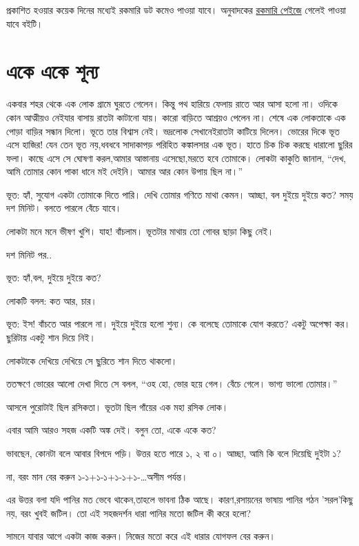 \documentclass[
]{book}
\begin{document}
প্রকাশিত হওয়ার কয়েক দিনের মধ্যেই রকমারি ডট কমেও পাওয়া যাবে। অনুবাদকের \href{https://www.rokomari.com/book/author/47631}{রকমারি পেইজে} গেলেই পাওয়া যাবে বইটি।

\hypertarget{one-one-zero}{%
\chapter{একে একে শূন্য}\label{one-one-zero}}

একবার শহর থেকে এক লোক গ্রামে ঘুরতে গেলেন। কিন্তু পথ হারিয়ে ফেলায় রাতে আর আসা হলো না। ওদিকে কোন আত্মীয়ও নেইযার বাসায় রাতটা কাটানো যায়। কারো বাড়িতে আশ্রয়ও পেলেন না। শেষে এক লোকতাকে এক পোড়া বাড়ির সন্ধান দিলো। ভূতে তার বিশ্বাস নেই। ভদ্রলোক সেখানেইরাতটা কাটিয়ে দিলেন। ভোরের দিকে ভূত এসে হাজির! যেন তেন ভূত নয়,ধবধবে সাদাকাপড় পরিহিত কঙ্কালসার এক ভূত। হাতে চিক চিক করছে ধারালো ছুরির ফলা। কাছে এসে সে ঘোষণা করল,আমার আস্তানায় এসেছো,মরতে হবে তোমাকে। লোকটা কাকুতি জানাল, ``দেখ, আমি তোমার কোন পাকা ধানে মই দেইনি। আমার আর কোন উপায় ছিল না।''

ভূত: হ্যাঁ, সুযোগ একটা তোমাকে দিতে পারি। দেখি তোমার গণিতে মাথা কেমন। আচ্ছা, বল দুইয়ে দুইয়ে কত? সময় দশ মিনিট। বলতে পারলে বেঁচে যাবে।

লোকটা মনে মনে ভীষণ খুশি। যাহ! বাঁচলাম। ভূতটার মাথায় তো গোবর ছাড়া কিছু নেই।

দশ মিনিট পর..

ভূত: হ্যাঁ,বল, দুইয়ে দুইয়ে কত?

লোকটি বলল: কত আর, চার।

ভূত: ইস! বাঁচতে আর পারলে না। দুইয়ে দুইয়ে হলো শুন্য। কে বলেছে তোমাকে যোগ করতে? একটু অপেক্ষা কর। ছুরিটায় একটু শান দিয়ে নিই।

লোকটাকে দেখিয়ে দেখিয়ে সে ছুরিতে শান দিতে থাকলো।

ততক্ষণে ভোরের আলো দেখা দিতে সে বলল, ``ওহ হো, ভোর হয়ে গেল। বেঁচে গেলে। ভাগ্য ভালো তোমার।''

আসলে পুরোটাই ছিল রসিকতা। ভূতটা ছিল গাঁয়ের এক মহা রসিক লোক।

এবার আমি আরও সহজ একটি অঙ্ক দেই। বলুন তো, একে একে কত?

ভাবছেন, কোনটা বলে আবার বিপদে পড়ি। উত্তর হতে পারে ১, ২ বা ০। আচ্ছা, আমি কি বলে দিয়েছি দুইটা ১?

না, বরং মান বের করুন ১-১+১-১+১-১+১-\ldots অসীম পর্যন্ত।

এর উত্তর বলা যদি পানির মত ভেবে থাকেন,তাহলে ভাবনা ঠিক আছে। কারণ,রসায়নের ভাষায় পানির গঠন 'সরল'কিছু নয়, বরং খুবই জটিল। তো এই সহজদর্শন ধারা পানির মতো জটিল কী করে হলো?

সামনে যাবার আগে একটা কাজ করুন। নিজের মতো করে এই ধারার যোগফল বের করুন।
\end{document}
